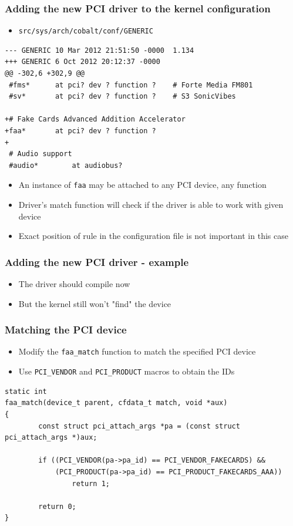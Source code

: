\documentclass[dvipsnames,table]{beamer}
\begin{document}
\begin{frame}[fragile]
\frametitle{Adding the new PCI driver to the kernel configuration}
\scriptsize
\begin{itemize}
	\item {\tt src/sys/arch/cobalt/conf/GENERIC}
\end{itemize}
\begin{verbatim}
--- GENERIC	10 Mar 2012 21:51:50 -0000	1.134
+++ GENERIC	6 Oct 2012 20:12:37 -0000
@@ -302,6 +302,9 @@
 #fms*		at pci? dev ? function ?	# Forte Media FM801
 #sv*		at pci? dev ? function ?	# S3 SonicVibes
 
+# Fake Cards Advanced Addition Accelerator
+faa*		at pci? dev ? function ?
+
 # Audio support
 #audio*		at audiobus?
\end{verbatim}
\begin{itemize}
	\item An instance of {\tt faa} may be attached to any PCI device, any function
	\item Driver's match function will check if the driver is able to work with given device
	\item Exact position of rule in the configuration file is not important in this case
\end{itemize}
\end{frame}

\begin{frame}
\frametitle{Adding the new PCI driver - example}
\begin{itemize}
	\item The driver should compile now
	\item But the kernel still won't "find" the device
\end{itemize}
\end{frame}

\begin{frame}[fragile]
\frametitle{Matching the PCI device}
\begin{itemize}
	\item Modify the {\tt faa\_match} function to match the specified PCI device
	\item Use {\tt PCI\_VENDOR} and {\tt PCI\_PRODUCT} macros to obtain the IDs
\end{itemize}
\scriptsize
\begin{verbatim}
static int
faa_match(device_t parent, cfdata_t match, void *aux)
{
        const struct pci_attach_args *pa = (const struct pci_attach_args *)aux;

        if ((PCI_VENDOR(pa->pa_id) == PCI_VENDOR_FAKECARDS) &&
            (PCI_PRODUCT(pa->pa_id) == PCI_PRODUCT_FAKECARDS_AAA))
                return 1;

        return 0;
}
\end{verbatim}
\end{frame}
\end{document}
